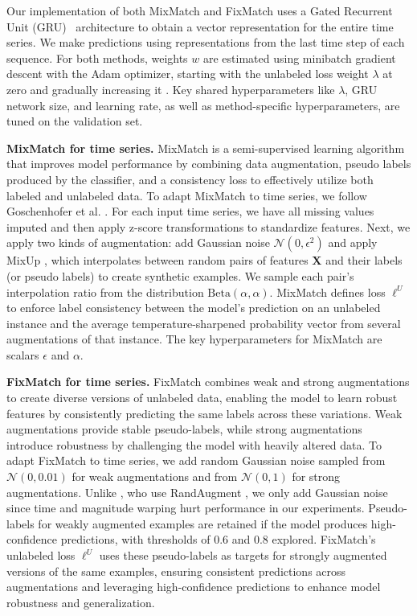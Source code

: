 Our implementation of both MixMatch and FixMatch uses a Gated Recurrent Unit (GRU)~\citep{gru_original} architecture to obtain a vector representation for the entire time series. 
We make predictions using representations from the last time step of each sequence.
For both methods, weights \( w \) are estimated using minibatch gradient descent with the Adam \citep{kingma2014adam} optimizer, starting with the unlabeled loss weight \( \lambda \) at zero and gradually increasing it \citep{tarvainen2017mean, berthelot2019mixmatch}. Key shared hyperparameters like \( \lambda \), GRU network size, and learning rate, as well as method-specific hyperparameters, are tuned on the validation set.

\textbf{MixMatch for time series.}
MixMatch is a semi-supervised learning algorithm that improves model performance by combining data augmentation, pseudo labels produced by the classifier, and a consistency loss to effectively utilize both labeled and unlabeled data. To adapt MixMatch \citep{berthelotMixMatchHolisticApproach2019} to time series, we follow Goschenhofer et al. \citep{goschenhofer2021deep}. For each input time series, we have all missing values imputed and then apply z-score transformations to standardize features.
Next, we apply two kinds of augmentation: add Gaussian noise \(\mathcal{N}(0, \epsilon^2)\) and apply MixUp \citep{zhangMixupEmpiricalRisk2017}, which interpolates between random pairs of features $\mathbf{X}$ and their labels (or pseudo labels) to create synthetic examples. We sample each pair's interpolation ratio from the distribution \(\text{Beta}(\alpha, \alpha)\). 
MixMatch defines loss $\ell^U$ to enforce label consistency between the model's prediction on an unlabeled instance and the average temperature-sharpened probability vector from several augmentations of that instance.
The key hyperparameters for MixMatch are scalars $\epsilon$ and $\alpha$. 



\textbf{FixMatch for time series.}
FixMatch \citep{sohnFixMatchSimplifyingSemisupervised2020} combines weak and strong augmentations to create diverse versions of unlabeled data, enabling the model to learn robust features by consistently predicting the same labels across these variations. Weak augmentations provide stable pseudo-labels, while strong augmentations introduce robustness by challenging the model with heavily altered data. To adapt FixMatch to time series, we add random Gaussian noise sampled from \(\mathcal{N}(0, 0.01)\) for weak augmentations and from \(\mathcal{N}(0, 1)\) for strong augmentations. Unlike \citep{goschenhofer2021deep}, who use RandAugment \citep{cubuk2020randaugment}, we only add Gaussian noise since time and magnitude warping hurt performance in our experiments. Pseudo-labels for weakly augmented examples are retained if the model produces high-confidence predictions, with thresholds of 0.6 and 0.8 explored. FixMatch's unlabeled loss $\ell^U$ uses these pseudo-labels as targets for strongly augmented versions of the same examples, ensuring consistent predictions across augmentations and leveraging high-confidence predictions to enhance model robustness and generalization.


